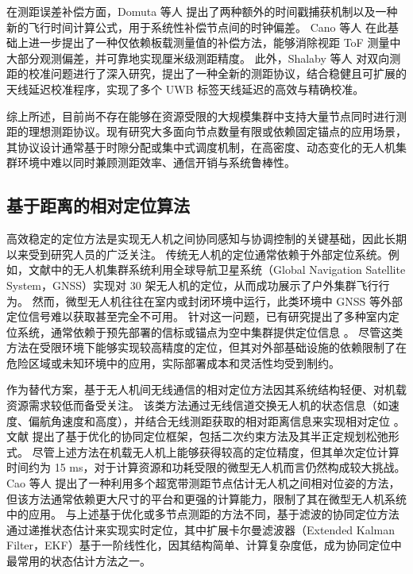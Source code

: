 在测距误差补偿方面，Domuta 等人 \cite{domuta2021two} 提出了两种额外的时间戳捕获机制以及一种新的飞行时间计算公式，用于系统性补偿节点间的时钟偏差。
Cano 等人 \cite{cano2022clock} 在此基础上进一步提出了一种仅依赖板载测量值的补偿方法，能够消除视距 ToF 测量中大部分观测偏差，并可靠地实现厘米级测距精度。
此外，Shalaby 等人 \cite{liu2023relative} 对双向测距的校准问题进行了深入研究，提出了一种全新的测距协议，结合稳健且可扩展的天线延迟校准程序，实现了多个 UWB 标签天线延迟的高效与精确校准。

综上所述，目前尚不存在能够在资源受限的大规模集群中支持大量节点同时进行测距的理想测距协议。现有研究大多面向节点数量有限或依赖固定锚点的应用场景，其协议设计通常基于时隙分配或集中式调度机制，在高密度、动态变化的无人机集群环境中难以同时兼顾测距效率、通信开销与系统鲁棒性。

\subsection{基于距离的相对定位算法}
高效稳定的定位方法是实现无人机之间协同感知与协调控制的关键基础，因此长期以来受到研究人员的广泛关注。
传统无人机的定位通常依赖于外部定位系统。例如，文献中的无人机集群系统利用全球导航卫星系统（Global Navigation Satellite System，GNSS）实现对 30 架无人机的定位，从而成功展示了户外集群飞行行为。
然而，微型无人机往往在室内或封闭环境中运行，此类环境中 GNSS 等外部定位信号难以获取甚至完全不可用。
针对这一问题，已有研究提出了多种室内定位系统，通常依赖于预先部署的信标或锚点为空中集群提供定位信息 \cite{jia2022composite,oumar2023indoor,brandstatter2022multi}。
尽管这类方法在受限环境下能够实现较高精度的定位，但其对外部基础设施的依赖限制了在危险区域或未知环境中的应用，实际部署成本和灵活性均受到制约。

作为替代方案，基于无人机间无线通信的相对定位方法因其系统结构轻便、对机载资源需求较低而备受关注。
该类方法通过无线信道交换无人机的状态信息（如速度、偏航角速度和高度），并结合无线测距获取的相对距离信息来实现相对定位 \cite{nguyen2023relative,cao2021relative}。
文献  提出了基于优化的协同定位框架，包括二次约束方法及其半正定规划松弛形式。
尽管上述方法在机载无人机上能够获得较高的定位精度，但其单次定位计算时间约为 15 ms，对于计算资源和功耗受限的微型无人机而言仍然构成较大挑战。
Cao 等人 \cite{cao2021relative} 提出了一种利用多个超宽带测距节点估计无人机之间相对位姿的方法，但该方法通常依赖更大尺寸的平台和更强的计算能力，限制了其在微型无人机系统中的应用。
与上述基于优化或多节点测距的方法不同，基于滤波的协同定位方法通过递推状态估计来实现实时定位，其中扩展卡尔曼滤波器（Extended Kalman Filter，EKF）基于一阶线性化，因其结构简单、计算复杂度低，成为协同定位中最常用的状态估计方法之一\cite{li2020autonomous}。

